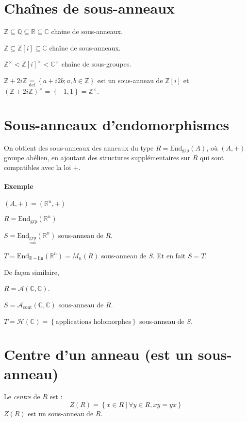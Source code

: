 \documentclass[reqno,a4paper,10pt]{report}
\makeatletter
\newcommand{\set}[1]{\left\lbrace #1 \right\rbrace} %
\newcommand{\IZ}{\ensuremath{\mathbb{Z}}\xspace} %
\newcommand{\IR}{\ensuremath{\mathbb{R}}\xspace} %
\newcommand{\IQ}{\ensuremath{\mathbb{Q}}\xspace} %
\newcommand{\IC}{\ensuremath{\mathbb{C}}\xspace} %
\newcommand{\Endgrp}[1]{\text{End}_{\text{grp}}\left(#1\right)}
\newcommand{\Endom}[2]{\text{End}_{#1}\left(#2\right)}
\newcommand{\such}{\ | \ }
\newcommand{\tdef}[1]{\underset{\text{def}}{ #1 }}
\let\olditemize=\itemize%
\renewenvironment{itemize}{%
    \olditemize%
  }{%
    \@noparlisttrue%
    \endlist%
  }%
\makeatother
\begin{document}
\section{Chaînes de sous-anneaux}
\begin{itemize}
  \item $\IZ \subseteq \IQ \subseteq \IR \subseteq \IC$ chaine de
    sous-anneaux.
  \item $\IZ \subseteq \IZ[i] \subseteq \IC$ chaîne de sous-anneaux.
  \item $\IZ^\times < {\IZ[i]}^\times < \IC^\times$ chaîne de sous-groupes.
  \item $\IZ + 2i\IZ \tdef{=} \set{a+i2b; a,b \in \IZ}$ est un sous-anneau
    de $\IZ[i]$ et ${(\IZ+2i\IZ)}^\times = \set{-1, 1} = \IZ^\times$.
\end{itemize}

\section{Sous-anneaux d'endomorphismes}
On obtient des sous-anneaux des anneaux du type $R=\Endgrp{A}$, où $(A,+)$
groupe abélien, en ajoutant des structures supplémentaires sur $R$ qui sont
compatibles avec la loi $+$.

\paragraph{Exemple} $(A,+) = (\IR^n, +)$
\begin{itemize}
  \item $R = \Endgrp{\IR^n}$
  \item $S=\Endom{\underset{\text{cont}}{\text{grp}}}{\IR^n}$ sous-anneau de
    $R$.
  \item $T=\Endom{\IR-\text{lin}}{\IR^n}=M_n(R)$ sous-anneau de $S$. Et en fait
    $S=T$.
\end{itemize}

De façon similaire, 
\begin{itemize}
  \item $R=\mathcal{A}(\IC, \IC)$.
  \item $S=\mathcal{A}_\text{cont}(\IC, \IC)$ sous-anneau de $R$.
  \item $T=\mathscr{H}(\IC)=\set{\text{applications holomorphes}}$ sous-anneau
    de $S$.
\end{itemize}

\section{Centre d'un anneau (est un sous-anneau)}
Le \emph{centre} de $R$ est :
\[Z(R)=\set{x \in R \such \forall y \in R, xy=yx}\]
$Z(R)$ est un sous-anneau de $R$.
\end{document}
